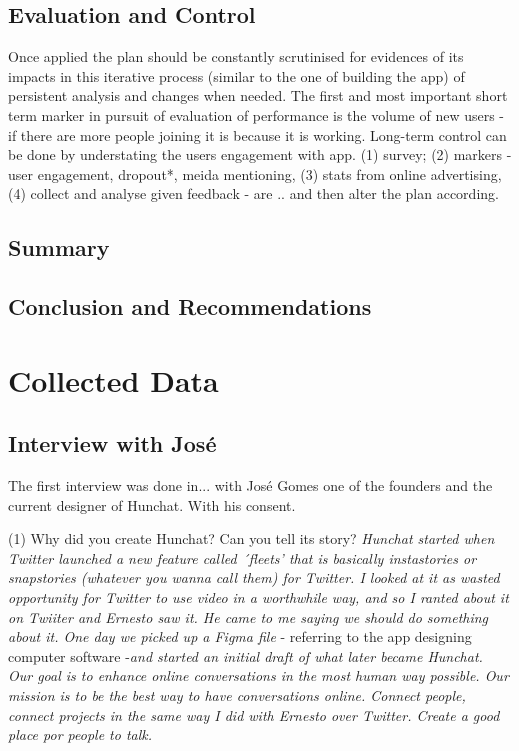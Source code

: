 \documentclass[12pt]{article}
\begin{document}
\subsection{Evaluation and Control}

Once applied the plan should be constantly scrutinised for evidences of its impacts in this iterative process (similar to the one of building the app) of persistent analysis and changes when needed. The first and most important short term marker in pursuit of evaluation of performance is the volume of new users - if there are more people joining it is because it is working. Long-term control can be done by understating the users engagement with app. (1) survey; (2) markers - user engagement, dropout*, meida mentioning,  (3) stats from online advertising, (4) collect and analyse given feedback - are .. and then alter the plan according.


\subsection{Summary}


\subsection{Conclusion and Recommendations}




\cleardoublepage
\newpage	

\printbibliography
\cleardoublepage

\appendix

\section{Collected Data}\label{data}
\subsection {Interview with José} \label{ze}
The first interview was done in... with José Gomes one of the founders and the current designer of Hunchat. With his consent.

(1) Why did you create Hunchat? Can you tell its story? \textit{Hunchat started when Twitter launched a new feature called ´fleets' that is basically instastories or snapstories (whatever you wanna call them) for Twitter. I looked at it as wasted opportunity for Twitter to use video in a worthwhile way, and so I ranted about it on Twiiter and Ernesto saw it. He came to me saying we should do something about it. One day we picked up a Figma file} - referring to the app designing computer software -\textit{and started an initial draft of what later became Hunchat. Our goal is to enhance online conversations in the most human way possible. Our mission is to be the best way to have conversations online. Connect people, connect projects in the same way I did with Ernesto over Twitter. Create a good place por people to talk.} 
\end{document}
